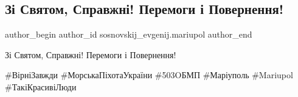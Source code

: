  
 
 
 
 

\subsection{Зі Святом, Справжні! Перемоги і Повернення!}
\label{sec:23_05_2023.fb.sosnovskij_evgenij.mariupol.1.zi_sjatom_spravzhni_peremogy_i_povernennja}

\ifcmt
 author_begin
   author_id sosnovskij_evgenij.mariupol
 author_end
\fi

Зі Святом, Справжні! Перемоги і Повернення!

\#ВірніЗавжди \#МорськаПіхотаУкраїни \#503OБМП \#Маріуполь \#Mariupol \#ТакіКрасивіЛюди
